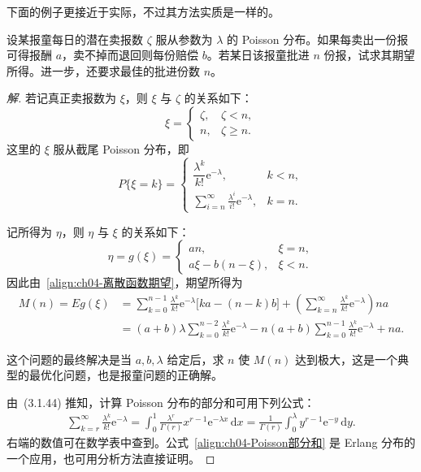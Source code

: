 \documentclass[../../main.tex]{subfiles}
\begin{document}
下面的例子更接近于实际，不过其方法实质是一样的。

\begin{example}[报童问题]\label{example:ch04-报童问题}
设某报童每日的潜在卖报数 $\zeta$ 服从参数为 $\lambda$ 的 Poisson 分布。如果每卖出一份报可得报酬 $a$，卖不掉而退回则每份赔偿 $b$。若某日该报童批进 $n$ 份报，试求其期望所得。进一步，还要求最佳的批进份数 $n$。
\end{example}

\begin{proof}[解]
若记真正卖报数为 $\xi$，则 $\xi$ 与 $\zeta$ 的关系如下：
\[
\xi=\begin{cases}
\zeta,&\zeta<n,\\
n,&\zeta\geqslant n.
\end{cases}
\]
这里的 $\xi$ 服从截尾 Poisson 分布，即
\[
P\{\xi=k\}=
\begin{cases}
\dfrac{\lambda^k}{k!}\mathrm{e}^{-\lambda},&k<n,\\[6pt]
\displaystyle\sum_{i=n}^{\infty}\frac{\lambda^i}{i!}\mathrm{e}^{-\lambda},&k=n.
\end{cases}
\]

记所得为 $\eta$，则 $\eta$ 与 $\xi$ 的关系如下：
\[
\eta=g(\xi)=
\begin{cases}
an,&\xi=n,\\
a\xi-b(n-\xi),&\xi<n.
\end{cases}
\]
因此由~\eqref{align:ch04-离散函数期望}，期望所得为
\begin{align*}
M(n)=Eg(\xi)
&=\sum_{k=0}^{n-1}\frac{\lambda^k}{k!}\mathrm{e}^{-\lambda}\bigl[ka-(n-k)b\bigr]
+\left(\sum_{k=n}^{\infty}\frac{\lambda^k}{k!}\mathrm{e}^{-\lambda}\right)na\\
&=(a+b)\lambda\sum_{k=0}^{n-2}\frac{\lambda^k}{k!}\mathrm{e}^{-\lambda}
-n(a+b)\sum_{k=0}^{n-1}\frac{\lambda^k}{k!}\mathrm{e}^{-\lambda}+na.
\end{align*}

这个问题的最终解决是当 $a,b,\lambda$ 给定后，求 $n$ 使 $M(n)$ 达到极大，这是一个典型的最优化问题，也是报童问题的正确解。

由~(3.1.44) 推知，计算 Poisson 分布的部分和可用下列公式：
\begin{align}
\sum_{k=r}^{\infty}\frac{\lambda^k}{k!}\mathrm{e}^{-\lambda}
=\int_0^1\frac{\lambda^r}{\Gamma(r)}x^{r-1}\mathrm{e}^{-\lambda x}\,\mathrm{d}x
=\frac{1}{\Gamma(r)}\int_0^{\lambda}y^{r-1}\mathrm{e}^{-y}\,\mathrm{d}y.\label{align:ch04-Poisson部分和}
\end{align}
右端的数值可在数学表中查到。公式~\eqref{align:ch04-Poisson部分和} 是 Erlang 分布的一个应用，也可用分析方法直接证明。
\end{proof}
\end{document}
